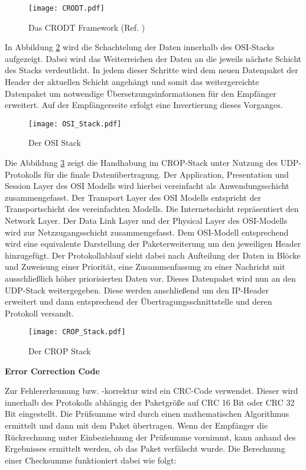 \begin{figure}[H]
\centering
\texttt{[image: CRODT.pdf]}
\caption{Das CRODT Framework (Ref. \cite{Daher})}
\label{fig:CRODT}
\end{figure}

In Abbildung \ref{fig:OSI_Stack} wird die Schachtelung der Daten
innerhalb des OSI-Stacks aufgezeigt. Dabei wird das Weiterreichen der Daten an
die jeweils n{\"a}chste Schicht des Stacks verdeutlicht. In jedem dieser Schritte wird dem neuen
Datenpaket der Header der aktuellen Schicht angeh{\"a}ngt und somit das
weitergereichte Datenpaket um notwendige {\"U}bersetzungsinformationen f{\"u}r
den Empf{\"a}nger erweitert. Auf der Empf{\"a}ngerseite erfolgt eine Invertierung dieses
Vorganges. 

\begin{figure}[H]
\centering
\texttt{[image: OSI\_Stack.pdf]}
\caption{Der OSI Stack}
\label{fig:OSI_Stack}
\end{figure}
 
Die Abbildung \ref{fig:CROP_Stack} zeigt die Handhabung im CROP-Stack
unter Nutzung des UDP-Protokolls f{\"u}r die finale Daten{\"u}bertragung. Der
Application, Presentation und Session Layer des OSI Modells
wird hierbei vereinfacht als Anwendungsschicht zusammengefasst.
Der Transport Layer des OSI Modells entspricht der Transportschicht des
vereinfachten Modells. Die Internetschicht repr{\"a}sentiert den Network
Layer.
Der Data Link Layer und der Physical Layer des OSI-Modells wird zur
Netzzugangsschicht zusammengefasst. Dem OSI-Modell entsprechend wird eine
equivalente Darstellung der Paketerweiterung um den jeweiligen Header
hinzugef{\"u}gt. Der Protokollablauf sieht dabei nach Aufteilung der Daten in
Bl{\"o}cke und Zuweisung einer Priorit{\"a}t, eine Zusammenfassung zu einer
Nachricht mit ausschließlich höher priorisierten Daten vor. Dieses Datenpaket
wird nun an den UDP-Stack weitergegeben. Diese werden
anschlie{\ss}end um den IP-Header erweitert und dann entsprechend
der {\"U}bertragungsschnittstelle und deren Protokoll versandt.

\begin{figure}[H]
\centering
\texttt{[image: CROP\_Stack.pdf]}
\caption{Der CROP Stack}
\label{fig:CROP_Stack}
\end{figure}

\textbf{Error Correction Code}

Zur Fehlererkennung bzw. -korrektur wird ein CRC-Code verwendet. Dieser wird
innerhalb des Protokolls abhängig der Paketgr{\"o}{\ss}e auf CRC 16 Bit oder
CRC 32 Bit eingestellt. Die Pr{\"u}fsumme wird durch einen mathematischen
Algorithmus ermittelt und dann mit dem Paket {\"u}bertragen. Wenn der
Empf{\"a}nger die R{\"u}ckrechnung unter Einbeziehnung der Pr{\"u}fsumme
vornimmt, kann anhand des Ergebnisses ermittelt werden, ob das Paket
verf{\"a}lscht wurde. Die Berechnung einer Checksumme funktioniert dabei wie
folgt:

